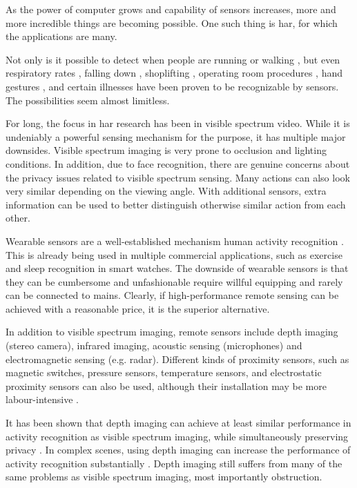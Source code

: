 As the power of computer grows and capability of sensors increases,
more and more incredible things are becoming possible.
One such thing is \gls{har},
for which the applications are many.

Not only is it possible to detect when people are running or walking \cite{running-walking},
but even respiratory rates \cite{breathing}, falling down \cite{falling}, shoplifting \cite{shoplifting},
operating room procedures \cite{operatingroom}, hand gestures \cite{handgestures},
and certain illnesses \cite{parkinsson} have been proven to be recognizable by sensors.
The possibilities seem almost limitless.

For long, the focus in \gls{har} research has been in visible spectrum video.
While it is undeniably a powerful sensing mechanism for the purpose,
it has multiple major downsides.
Visible spectrum imaging is very prone to occlusion and lighting conditions.
In addition, due to face recognition, there are genuine concerns about the privacy issues related to visible spectrum sensing. \cite{sensing-survey}
Many actions can also look very similar depending on the viewing angle.
With additional sensors, extra information can be used to better distinguish otherwise similar action from each other.

Wearable sensors are a well-established mechanism human activity recognition \cite{wearables}.
This is already being used in multiple commercial applications,
such as exercise and sleep recognition in smart watches.
The downside of wearable sensors is that they can be cumbersome and unfashionable
require willful equipping and rarely can be connected to mains.
Clearly, if high-performance remote sensing can be achieved with a reasonable price,
it is the superior alternative.

In addition to visible spectrum imaging,
remote sensors include depth imaging (stereo camera),
infrared imaging, acoustic sensing (microphones) and electromagnetic sensing (e.g. radar).
Different kinds of proximity sensors, such as magnetic switches, pressure sensors, temperature sensors,
and electrostatic proximity sensors can also be used,
although their installation may be more labour-intensive \cite{sensing-survey}.

It has been shown that depth imaging can achieve at least similar performance in activity recognition as visible spectrum imaging,
while simultaneously preserving privacy \cite{depth}.
In complex scenes, using depth imaging can increase the performance of activity recognition substantially \cite{depth-2}.
Depth imaging still suffers from many of the same problems as visible spectrum imaging,
most importantly obstruction.

